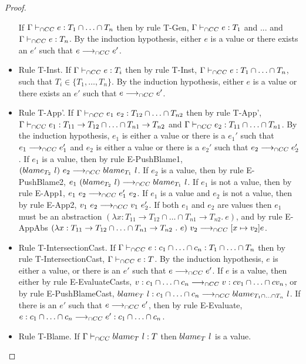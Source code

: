 \documentclass[a4paper]{article}
\begin{document}
\begin{proof}
\begin{itemize}
    If $\Gamma \vdash_{\cap CC} e : T_1 \cap \ldots \cap T_n$ then by rule T-Gen, $\Gamma \vdash_{\cap CC} e : T_1$ and ... and $\Gamma \vdash_{\cap CC} e : T_n$.
    By the induction hypothesis, either $e$ is a value or there exists an $e'$ such that $e \longrightarrow_{\cap CC} e'$.
    \item Rule T-Inst.
    If $\Gamma \vdash_{\cap CC} e : T_i$ then by rule T-Inst, $\Gamma \vdash_{\cap CC} e : T_1 \cap \ldots \cap T_n$, such that $T_i \in \{T_1, \ldots, T_n\}$.
    By the induction hypothesis, either $e$ is a value or there exists an $e'$ such that $e \longrightarrow_{\cap CC} e'$.
    \item Rule T-App'.
    If $\Gamma \vdash_{\cap CC} e_1\ e_2 : T_{12} \cap \ldots \cap T_{n2}$ then by rule T-App', $\Gamma \vdash_{\cap CC} e_1 : T_{11} \rightarrow T_{12} \cap \ldots \cap T_{n1} \rightarrow T_{n2}$ and $\Gamma \vdash_{\cap CC} e_2 : T_{11} \cap \ldots \cap T_{n1}$.
    By the induction hypothesis, $e_1$ is either a value or there is a $e_1'$ such that $e_1 \longrightarrow_{\cap CC} e_1'$ and $e_2$ is either a value or there is a $e_2'$ such that $e_2 \longrightarrow_{\cap CC} e_2'$.
    If $e_1$ is a value, then by rule E-PushBlame1, $(blame_{T_2}\ l)\ e_2 \longrightarrow_{\cap CC} blame_{T_1}\ l$.
    If $e_2$ is a value, then by rule E-PushBlame2, $e_1\ (\blame{T_2}{l}) \gios \blame{T_1}{l}$.
    If $e_1$ is not a value, then by rule E-App1, $e_1\ e_2 \longrightarrow_{\cap CC} e_1'\ e_2$.
    If $e_1$ is a value and $e_2$ is not a value, then by rule E-App2, $v_1\ e_2 \longrightarrow_{\cap CC} v_1\ e_2'$.
    If both $e_1$ and $e_2$ are values then $e_1$ must be an abstraction $(\lambda x : T_{11} \rightarrow T_{12} \cap \ldots \cap T_{n1} \rightarrow T_{n2} .\ e)$, and by rule E-AppAbs $(\lambda x : T_{11} \rightarrow T_{12} \cap \ldots \cap T_{n1} \rightarrow T_{n2}\ .\ e)\ v_2 \gios [x \mapsto v_2]e$.
    \item Rule T-IntersectionCast.
    If $\Gamma \vdash_{\cap CC} e : c_1 \cap \ldots \cap c_n : T_1 \cap \ldots \cap T_n$ then by rule T-IntersectionCast, $\Gamma \vdash_{\cap CC} e : T$.
    By the induction hypothesis, $e$ is either a value, or there is an $e'$ such that $e \longrightarrow_{\cap CC} e'$.
    If $e$ is a value, then either by rule E-EvaluateCasts, $v : c_1 \cap \ldots \cap c_n \longrightarrow_{\cap CC} v : cv_1 \cap \ldots \cap cv_n$, or by rule E-PushBlameCast, $blame_{T}\ l : c_1 \cap \ldots \cap c_n \longrightarrow_{\cap CC} blame_{T_1 \cap \ldots \cap T_n}\ l$.
    If there is an $e'$ such that $e \longrightarrow_{\cap CC} e'$, then by rule E-Evaluate, $e : c_1 \cap \ldots \cap c_n \longrightarrow_{\cap CC} e' : c_1 \cap \ldots \cap c_n$.
    \item Rule T-Blame.
    If $\Gamma \vdash_{\cap CC} blame_{T}\ l : T$ then $blame_{T}\ l$ is a value.
\end{itemize}
\end{proof}
\end{document}
